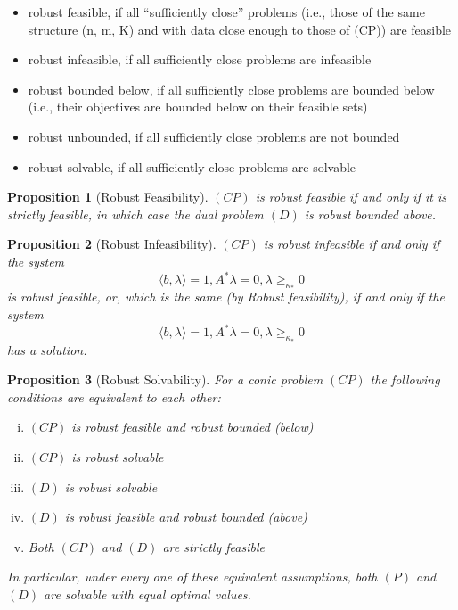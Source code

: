 \documentclass[12pt]{article}
\newtheorem*{proposition}{Proposition}
\begin{document}
   \begin{itemize}
       \item robust feasible, if all “sufficiently close” problems (i.e., those of the same structure
(n, m, K) and with data close enough to those of (CP)) are feasible
\item robust infeasible, if all sufficiently close problems are infeasible
\item robust bounded below, if all sufficiently close problems are bounded below (i.e., their objectives are bounded below on their feasible sets)
\item robust unbounded, if all sufficiently close problems are not bounded
\item robust solvable, if all sufficiently close problems are solvable
   \end{itemize}
   \begin{proposition}
   [Robust Feasibility] $(CP)$ is robust feasible if and only if it is strictly feasible, in which case the dual problem $(D)$ is robust bounded above.
   \end{proposition}
   \begin{proposition}
   [Robust Infeasibility] $(CP)$ is robust infeasible if and only if the system 
   $$\langle b,\lambda \rangle = 1, A^* \lambda = 0, \lambda \geq_{\kappa_*} 0$$
   is robust feasible, or, which is the same (by Robust feasibility), if and only if the system
   $$\langle b,\lambda \rangle = 1, A^* \lambda = 0, \lambda \geq_{\kappa_*} 0$$ has a solution.
   \end{proposition}
    \newpage
   \begin{proposition}
   [Robust Solvability] For a conic problem $(CP)$ the following conditions are equivalent to each other:
   \begin{enumerate}[(i)]
   \item $(CP)$ is robust feasible and robust bounded (below)
   \item $(CP)$ is robust solvable
   \item $(D)$ is robust solvable
   \item $(D)$ is robust feasible and robust bounded (above)
   \item Both $(CP)$ and $(D)$  are strictly feasible
   \end{enumerate}
   In particular, under every one of these equivalent assumptions, both $(P)$ and $(D)$ are solvable with equal optimal values.
   \end{proposition}
   \newpage
\end{document}
